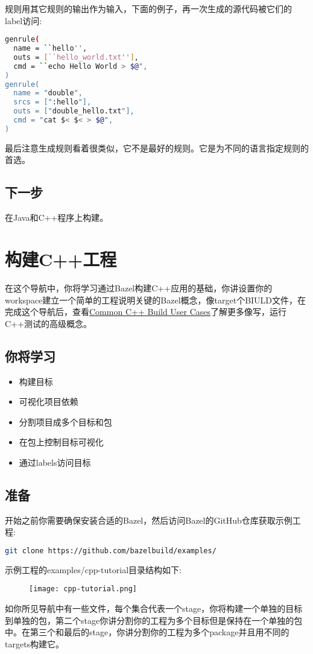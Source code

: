 规则用其它规则的输出作为输入，下面的例子，再一次生成的源代码被它们的label访问:
\begin{lstlisting}[language=Bash]
genrule(
  name = ``hello'',
  outs = [``hello_world.txt''],
  cmd = ``echo Hello World > $@",
)
genrule(
  name = "double",
  srcs = [":hello"],
  outs = ["double_hello.txt"],
  cmd = "cat $< $< > $@",
)
\end{lstlisting}
最后注意生成规则看着很类似，它不是最好的规则。它是为不同的语言指定规则的首选。
\subsection{下一步}
在Java和C++程序上构建。
\section{构建C++工程}
在这个导航中，你将学习通过Bazel构建C++应用的基础，你讲设置你的workspace建立一个简单的工程说明关键的Bazel概念，像target个BIULD文件，在完成这个导航后，查看\href{https://docs.bazel.build/versions/master/tutorial/cpp-use-cases.html}{Common C++ Build User Cases}了解更多像写，运行C++测试的高级概念。
\subsection{你将学习}
\begin{itemize}
	\item 构建目标
	\item 可视化项目依赖
	\item 分割项目成多个目标和包
	\item 在包上控制目标可视化
	\item 通过labels访问目标
\end{itemize}
\subsection{准备}
开始之前你需要确保安装合适的Bazel，然后访问Bazel的GitHub仓库获取示例工程:
\begin{lstlisting}[language=Bash]
git clone https://github.com/bazelbuild/examples/
\end{lstlisting}
示例工程的examples/cpp-tutorial目录结构如下:
\begin{figure}[H]
	\texttt{[image: cpp-tutorial.png]}
\end{figure}
如你所见导航中有一些文件，每个集合代表一个stage，你将构建一个单独的目标到单独的包，第二个stage你讲分割你的工程为多个目标但是保持在一个单独的包中。在第三个和最后的stage，你讲分割你的工程为多个package并且用不同的targets构建它。
